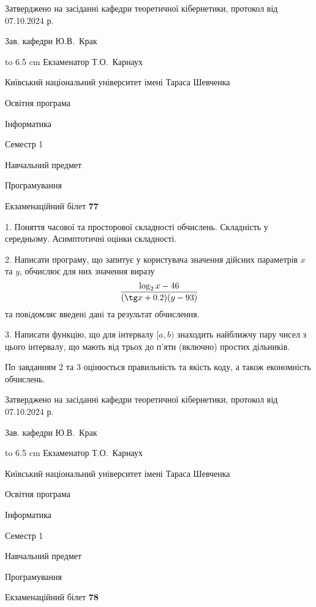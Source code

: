 \documentclass[12pt, ukrainian]{article}
\begin{document}
{\smallskip\smallskip \begin {scriptsize} Затверджено на засіданні кафедри теоретичної кібернетики, протокол   від   07.10.2024 р.\par\smallskip\smallskip\smallskip\smallskip
{\parbox {6.5 cm} {Зав. кафедри \dotfill Ю.В.~Крак}}\hspace {0.7cm} {\hbox to 6.5 cm { Екзаменатор \dotfill Т.О.~Карнаух}} \end{scriptsize}}
\vspace{0.9cm}
{{\begin {scriptsize}\par
{ \center  Київський національний університет імені Тараса Шевченка \par}
{\parbox {5 cm}{Освітня програма \hfill}{\parbox {7 cm}{Інформатика\hfill}}\parbox {6 cm}{\hfill Семестр 1}}\par
{\parbox {5 cm} {Навчальний предмет \hfill}\parbox {7 cm}{Програмування \hfill}\parbox {6cm}{\hfill}\par}\vspace{-15pt} \end{scriptsize}}{\center Екзаменаційний білет \No \textbf { 77 }\par}}
{%
1. Поняття часової та просторової складності обчислень. Складність у середньому. Асимптотичні оцінки складності.%
\par
2. Написати програму, що запитує у користувача значення дійсних параметрів $x$ та $y$, обчислює для них значення виразу 
$$\frac{\log_{2} x - 46}{(\tg x + 0.2) (y - 93)}$$ 
та повiдомляє введенi данi та результат обчислення.

\par
3. Написати функцію, що для інтервалу $[a, b)$ знаходить найближчу пару чисел з цього інтервалу, що мають від трьох до п'яти (включно) простих дільників.

По завданням 2 та 3 оцінюється правильність та якість коду, а також економність обчислень.

}
{\smallskip\smallskip \begin {scriptsize} Затверджено на засіданні кафедри теоретичної кібернетики, протокол   від   07.10.2024 р.\par\smallskip\smallskip\smallskip\smallskip
{\parbox {6.5 cm} {Зав. кафедри \dotfill Ю.В.~Крак}}\hspace {0.7cm} {\hbox to 6.5 cm { Екзаменатор \dotfill Т.О.~Карнаух}} \end{scriptsize}}
\vspace{0.9cm}
{{\begin {scriptsize}\par
{ \center  Київський національний університет імені Тараса Шевченка \par}
{\parbox {5 cm}{Освітня програма \hfill}{\parbox {7 cm}{Інформатика\hfill}}\parbox {6 cm}{\hfill Семестр 1}}\par
{\parbox {5 cm} {Навчальний предмет \hfill}\parbox {7 cm}{Програмування \hfill}\parbox {6cm}{\hfill}\par}\vspace{-15pt} \end{scriptsize}}{\center Екзаменаційний білет \No \textbf { 78 }\par}}
\end{document}
